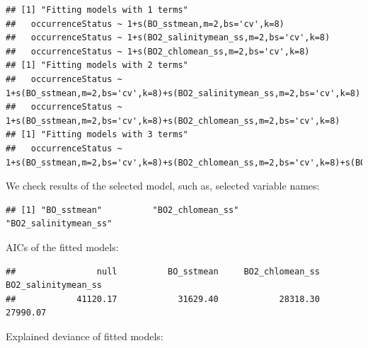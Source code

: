 \documentclass[
]{book}
\newenvironment{Shaded}{\begin{snugshade}}{\end{snugshade}}
\newcommand{\ControlFlowTok}[1]{\textcolor[rgb]{0.13,0.29,0.53}{\textbf{#1}}}
\newcommand{\FunctionTok}[1]{\textcolor[rgb]{0.13,0.29,0.53}{\textbf{#1}}}
\newcommand{\NormalTok}[1]{#1}
\newcommand{\SpecialCharTok}[1]{\textcolor[rgb]{0.81,0.36,0.00}{\textbf{#1}}}
\begin{document}
\begin{verbatim}
## [1] "Fitting models with 1 terms"
##   occurrenceStatus ~ 1+s(BO_sstmean,m=2,bs='cv',k=8) 
##   occurrenceStatus ~ 1+s(BO2_salinitymean_ss,m=2,bs='cv',k=8) 
##   occurrenceStatus ~ 1+s(BO2_chlomean_ss,m=2,bs='cv',k=8) 
## [1] "Fitting models with 2 terms"
##   occurrenceStatus ~ 1+s(BO_sstmean,m=2,bs='cv',k=8)+s(BO2_salinitymean_ss,m=2,bs='cv',k=8) 
##   occurrenceStatus ~ 1+s(BO_sstmean,m=2,bs='cv',k=8)+s(BO2_chlomean_ss,m=2,bs='cv',k=8) 
## [1] "Fitting models with 3 terms"
##   occurrenceStatus ~ 1+s(BO_sstmean,m=2,bs='cv',k=8)+s(BO2_chlomean_ss,m=2,bs='cv',k=8)+s(BO2_salinitymean_ss,m=2,bs='cv',k=8)
\end{verbatim}

We check results of the selected model, such as, selected variable names:

\begin{Shaded}
\end{Shaded}

\begin{verbatim}
## [1] "BO_sstmean"          "BO2_chlomean_ss"     "BO2_salinitymean_ss"
\end{verbatim}

AICs of the fitted models:

\begin{Shaded}
\end{Shaded}

\begin{verbatim}
##                null          BO_sstmean     BO2_chlomean_ss BO2_salinitymean_ss 
##            41120.17            31629.40            28318.30            27990.07
\end{verbatim}

Explained deviance of fitted models:

\begin{Shaded}
\end{Shaded}
\end{document}
